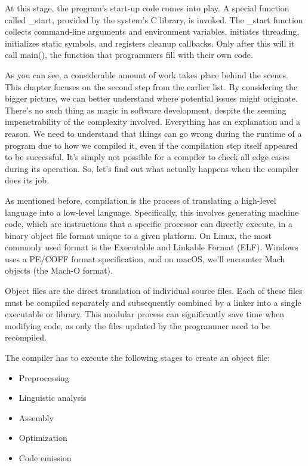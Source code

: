 At this stage, the program’s start-up code comes into play. A special function called \_start, provided by the system’s C library, is invoked. The \_start function collects command-line arguments and environment variables, initiates threading, initializes static symbols, and registers cleanup callbacks. Only after this will it call main(), the function that programmers fill with their own code.

As you can see, a considerable amount of work takes place behind the scenes. This chapter focuses on the second step from the earlier list. By considering the bigger picture, we can better understand where potential issues might originate. There’s no such thing as magic in software development, despite the seeming impenetrability of the complexity involved. Everything has an explanation and a reason. We need to understand that things can go wrong during the runtime of a program due to how we compiled it, even if the compilation step itself appeared to be successful. It’s simply not possible for a compiler to check all edge cases during its operation. So, let’s find out what actually happens when the compiler does its job.


As mentioned before, compilation is the process of translating a high-level language into a low-level language. Specifically, this involves generating machine code, which are instructions that a specific processor can directly execute, in a binary object file format unique to a given platform. On Linux, the most commonly used format is the Executable and Linkable Format (ELF). Windows uses a PE/COFF format specification, and on macOS, we’ll encounter Mach objects (the Mach-O format).

Object files are the direct translation of individual source files. Each of these files must be compiled separately and subsequently combined by a linker into a single executable or library. This modular process can significantly save time when modifying code, as only the files updated by the programmer need to be recompiled.

The compiler has to execute the following stages to create an object file:

\begin{itemize}
\item
Preprocessing

\item
Linguistic analysis

\item
Assembly

\item
Optimization

\item
Code emission
\end{itemize}

